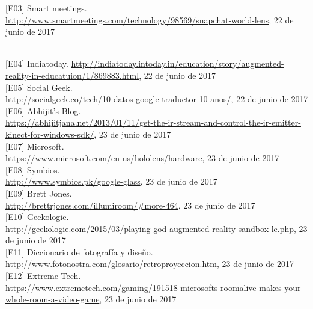 \documentclass[a4paper,openright,12pt]{report}
\begin{document}
\hypertarget{e03}{[E03] Smart meetings. \url{http://www.smartmeetings.com/technology/98569/snapchat-world-lens}, 22 de junio de 2017}\\

\hypertarget{e04}{[E04] Indiatoday. \url{http://indiatoday.intoday.in/education/story/augmented-reality-in-educatuion/1/869883.html}, 22 de junio de 2017}\\

\hypertarget{e05}{[E05] Social Geek.\\ \url{http://socialgeek.co/tech/10-datos-google-traductor-10-anos/}, 22 de junio de 2017}\\

\hypertarget{e06}{[E06] Abhijit's Blog.\\ \url{https://abhijitjana.net/2013/01/11/get-the-ir-stream-and-control-the-ir-emitter-kinect-for-windows-sdk/}, 23 de junio de 2017}\\

\hypertarget{e07}{[E07] Microsoft.\\ \url{https://www.microsoft.com/en-us/hololens/hardware}, 23 de junio de 2017}\\

\hypertarget{e08}{[E08] Symbios.\\ \url{http://www.symbios.pk/google-glass}, 23 de junio de 2017}\\

\hypertarget{e09}{[E09] Brett Jones.\\ \url{http://brettrjones.com/illumiroom/\#more-464}, 23 de junio de 2017}\\

\hypertarget{e10}{[E10] Geekologie.\\ \url{http://geekologie.com/2015/03/playing-god-augmented-reality-sandbox-le.php}, 23 de junio de 2017}\\

\hypertarget{e11}{[E11] Diccionario de fotografía y diseño.\\ \url{http://www.fotonostra.com/glosario/retroproyeccion.htm}, 23 de junio de 2017}\\

\hypertarget{e12}{[E12] Extreme Tech.\\ \url{https://www.extremetech.com/gaming/191518-microsofts-roomalive-makes-your-whole-room-a-video-game}, 23 de junio de 2017}\\
\end{document}
